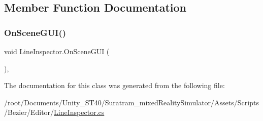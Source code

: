 \subsection{Member Function Documentation}
\mbox{\label{classLineInspector_a5d0b1541e2e3172637349afe61a1d1a3}} 
\subsubsection{\texorpdfstring{On\+Scene\+G\+U\+I()}{OnSceneGUI()}}
{\footnotesize\ttfamily void Line\+Inspector.\+On\+Scene\+G\+UI (\begin{DoxyParamCaption}{ }\end{DoxyParamCaption})\hspace{0.3cm}{\ttfamily [inline]}, {\ttfamily [private]}}



The documentation for this class was generated from the following file\+:\begin{DoxyCompactItemize}
\item 
/root/\+Documents/\+Unity\+\_\+\+S\+T40/\+Suratram\+\_\+mixed\+Reality\+Simulator/\+Assets/\+Scripts/\+Bezier/\+Editor/\hyperlink{LineInspector_8cs}{Line\+Inspector.\+cs}\end{DoxyCompactItemize}
